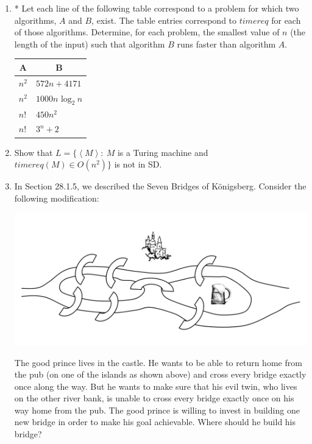 \documentclass[10pt]{article}
\newcommand{\brackets}[1]{\left< #1 \right>}
\begin{document}
\begin{enumerate}[1)]

\item
* Let each line of the following table correspond to a problem for which two algorithms, $A$ and $B$, exist.  The table entries correspond to $timereq$ for each of those algorithms.  Determine, for each problem, the smallest value of $n$ (the length of the input) such that algorithm $B$ runs faster than algorithm $A$.
\begin{center}
\begin{tabular}{| p{3cm} | p{3cm} |}
  \hline
  \multicolumn{1}{|c}{A}&
  \multicolumn{1}{|c|}{B}\\
  \hline
  $n^2$&$572n + 4171$\\
  \hline
  $n^2$&$1000n\textrm{ log}_2\ n$\\
  \hline
  $n!$&$450n^2$\\
  \hline
  $n!$&$3^n + 2$\\
  \hline
\end{tabular}
\end{center}


\item
Show that $L = \{\brackets{M}:\ M$ is a Turing machine and $timereq(M) \in O(n^2)\}$ is not in SD.


\item
In Section 28.1.5, we described the Seven Bridges of Königsberg.  Consider the following modification:\\

\begin{center}
\includegraphics[scale=.25]{images/bridges.png}
\end{center}

The good prince lives in the castle.  He wants to be able to return home from the pub (on one of the islands as
shown above) and cross every bridge exactly once along the way.  But he wants to make sure that his evil twin,
who lives on the other river bank, is unable to cross every bridge exactly once on his way home from the pub.  The
good prince is willing to invest in building one new bridge in order to make his goal achievable.  Where should he
build his bridge?


\end{enumerate}
\end{document}
